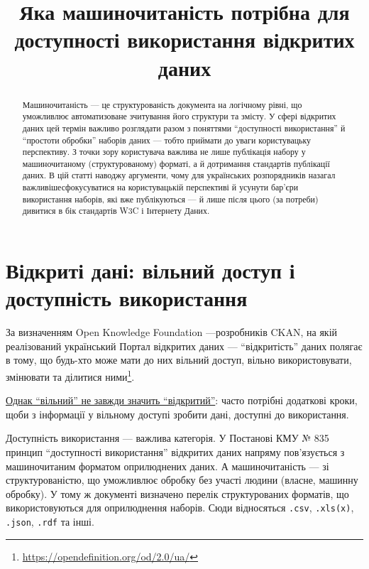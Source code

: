 \documentclass[
]{agujournal2019}
\begin{document}
\title{Яка машиночитаність потрібна для доступності використання
відкритих даних}



\begin{abstract}
Машиночитаність --- це структурованість документа на логічному рівні, що
уможливлює автоматизоване зчитування його структури та змісту. У сфері
відкритих даних цей термін важливо розглядати разом з поняттями
``доступності використання'' й ``простоти обробки'' наборів даних ---
тобто приймати до уваги користувацьку перспективу. З точки зору
користувача важлива не лише публікація набору у машиночитаному
(структурованому) форматі, а й дотримання стандартів публікації даних. В
цій статті наводжу аргументи, чому для українських розпорядників назагал
важливішесфокусуватися на користувацькій перспективі й усунути бар'єри
використання наборів, які вже публікуються --- й лише після цього (за
потреби) дивитися в бік стандартів W3C і Інтернету Даних.
\end{abstract}





\section{Відкриті дані: вільний доступ і доступність
використання}\label{ux432ux456ux434ux43aux440ux438ux442ux456-ux434ux430ux43dux456-ux432ux456ux43bux44cux43dux438ux439-ux434ux43eux441ux442ux443ux43f-ux456-ux434ux43eux441ux442ux443ux43fux43dux456ux441ux442ux44c-ux432ux438ux43aux43eux440ux438ux441ux442ux430ux43dux43dux44f}

За визначенням Open Knowledge Foundation ---розробників CKAN, на якій
реалізований український Портал відкритих даних --- ``відкритість''
даних полягає в тому, що будь-хто може мати до них вільний доступ,
вільно використовувати, змінювати та ділитися ними\footnote{\url{https://opendefinition.org/od/2.0/ua/}}.

\href{https://aims.gitbook.io/open-data-mooc/unit-1-open-data-principles/lesson-1.1-what-is-open-data\#id-5.-challenges}{Однак
``вільний'' не завжди значить ``відкритий''}: часто потрібні додаткові
кроки, щоби з інформації у вільному доступі зробити дані, доступні до
використання.

Доступність використання --- важлива категорія. У Постанові КМУ № 835
принцип ``доступності використання'' відкритих даних напряму
пов'язується з машиночитаним форматом оприлюднених даних. А
машиночитаність --- зі структурованістю, що уможливлює обробку без
участі людини (власне, машинну обробку). У тому ж документі визначено
перелік структурованих форматів, що використовуються для оприлюднення
наборів. Сюди відносяться \texttt{.csv}, \texttt{.xls(x)},
\texttt{.json}, \texttt{.rdf} та інші.
\end{document}
